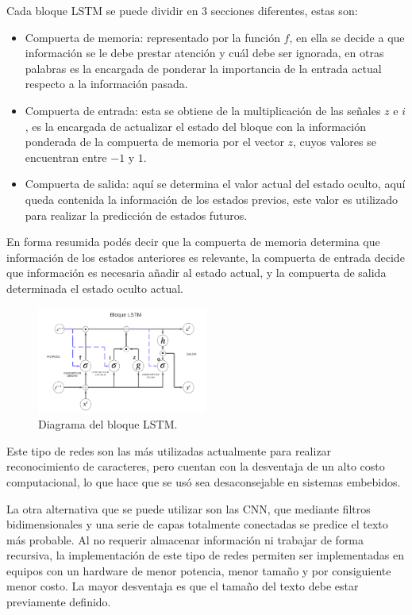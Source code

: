Cada bloque LSTM se puede dividir en 3 secciones diferentes, estas son:
\begin{itemize}
    \item Compuerta de memoria: representado por la función $f$, en ella se decide a que información se le debe prestar atención y cuál debe ser ignorada, en otras palabras es la encargada de ponderar la importancia de la entrada actual respecto a la información pasada.
    \item Compuerta de entrada: esta se obtiene de la multiplicación de las señales $z$ e $i$, es la encargada de actualizar el estado del bloque con la información ponderada de la compuerta de memoria por el vector $z$, cuyos valores se encuentran entre $-1$ y $1$.
    \item Compuerta de salida: aquí se determina el valor actual del estado oculto, aquí queda contenida la información de los estados previos, este valor es utilizado para realizar la predicción de estados futuros.
\end{itemize}
En forma resumida podés decir que la compuerta de memoria determina que información de los estados anteriores es relevante, la compuerta de entrada decide que información es necesaria añadir al estado actual, y la compuerta de salida determinada el estado oculto actual.
\begin{figure}[h]
    \centering
    \includegraphics[width=0.5\textwidth]{imgs/diagrama-lstm.png}
    \caption{Diagrama del bloque LSTM.}
    \label{fig:diagrama-LSTM}
\end{figure}

Este tipo de redes son las más utilizadas actualmente para realizar reconocimiento de caracteres, pero cuentan con la desventaja de un alto costo computacional, lo que hace que se usó sea desaconsejable en sistemas embebidos.

La otra alternativa que se puede utilizar son las CNN, que mediante filtros bidimensionales y una serie de capas totalmente conectadas se predice el texto más probable.
Al no requerir almacenar información ni trabajar de forma recursiva, la implementación
de este tipo de redes permiten ser implementadas en equipos con un hardware de menor potencia, menor tamaño y por consiguiente menor costo. La mayor desventaja es que el tamaño del texto debe estar previamente definido.

